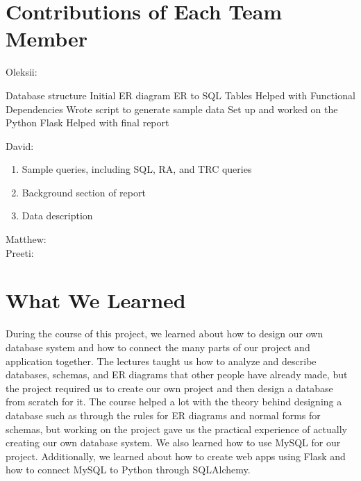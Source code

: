 \documentclass[12pt, oneside, a4paper]{article}
\begin{document}
    \section{Contributions of Each Team Member}
    Oleksii:
    \begin{outline}
        \1 Database structure
        \1 Initial ER diagram
        \1 ER to SQL Tables
        \1 Helped with Functional Dependencies
        \1 Wrote script to generate sample data
        \1 Set up and worked on the Python Flask
        \1 Helped with final report
    \end{outline}
    David:
    \begin{enumerate}
        \item Sample queries, including SQL, RA, and TRC queries
        \item Background section of report
        \item Data description
    \end{enumerate}
    Matthew:
    \\
    Preeti:
    \section{What We Learned}
    During the course of this project, we learned about how to design our own database system and how to connect the many parts of our project and application together. The lectures taught us how to analyze and describe databases, schemas, and ER diagrams that other people have already made, but the project required us to create our own project and then design a database from scratch for it. The course helped a lot with the theory behind designing a database such as through the rules for ER diagrams and normal forms for schemas, but working on the project gave us the practical experience of actually creating our own database system. We also learned how to use MySQL for our project. Additionally, we learned about how to create web apps using Flask and how to connect MySQL to Python through SQLAlchemy.
\end{document}
